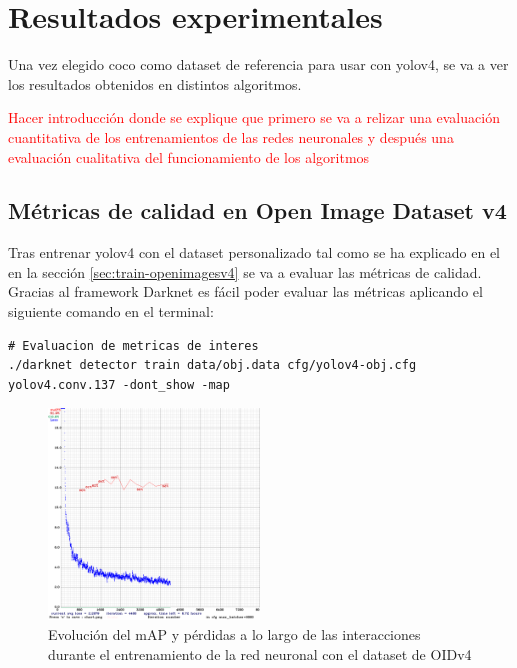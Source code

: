 \section{Resultados experimentales}
\label{sec:resultados-experimentales}

Una vez elegido \gls{coco} como dataset de referencia para usar con \gls{yolov4}, se va a ver los resultados obtenidos en distintos algoritmos.

\textcolor{red}{Hacer introducción donde se explique que primero se va a relizar una evaluación cuantitativa de los entrenamientos de las redes neuronales y después una evaluación cualitativa del funcionamiento de los algoritmos}

\subsection{Métricas de calidad en Open Image Dataset v4}
\label{subsec:metricas-calidad-openimagesv4}

Tras entrenar \gls{yolov4} con el dataset personalizado tal como se ha explicado en el en la sección \ref{sec:train-openimagesv4} se va a evaluar las métricas de calidad. Gracias al framework Darknet \cite{darknet13} es fácil poder evaluar las métricas aplicando el siguiente comando en el terminal:

\vspace{0.5cm}
\begin{lstlisting}[language=iPython,caption=Evaluación métricas de calidad del dataset utilizado para el entrenamiento de la red neuronal de detección de objetos,captionpos=b,label={lst:darknet-map}]
# Evaluacion de metricas de interes
./darknet detector train data/obj.data cfg/yolov4-obj.cfg yolov4.conv.137 -dont_show -map
\end{lstlisting}

\begin{figure}[ht]
\centering
\includegraphics[width=0.5\textwidth]{img/chapters/resultados/metricas/chart_train.png}
\caption{\label{fig:chart-train}Evolución del mAP y pérdidas a lo largo de las interacciones durante el entrenamiento de la red neuronal con el dataset de OIDv4}
\end{figure}

